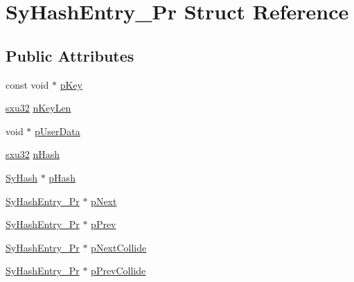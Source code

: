 \hypertarget{struct_sy_hash_entry___pr}{\section{Sy\-Hash\-Entry\-\_\-\-Pr Struct Reference}
\label{da/dbc/struct_sy_hash_entry___pr}
}
\subsection*{Public Attributes}
\begin{DoxyCompactItemize}
\item 
const void $\ast$ \hyperlink{struct_sy_hash_entry___pr_aa4c8c98ec7150fd90b413f0f9cc2d600}{p\-Key}
\item 
\hyperlink{unqlite_8c_abc5a8a3f345c200c98c485551f49666e}{sxu32} \hyperlink{struct_sy_hash_entry___pr_af6819beb48a1f81de55c46437c393efc}{n\-Key\-Len}
\item 
void $\ast$ \hyperlink{struct_sy_hash_entry___pr_aa64d3bb9514290195374bb7b609a4ca5}{p\-User\-Data}
\item 
\hyperlink{unqlite_8c_abc5a8a3f345c200c98c485551f49666e}{sxu32} \hyperlink{struct_sy_hash_entry___pr_ad03680a11812d7decfbb4ef5fe7654ec}{n\-Hash}
\item 
\hyperlink{struct_sy_hash}{Sy\-Hash} $\ast$ \hyperlink{struct_sy_hash_entry___pr_a8a5c25665356d85d7b6cd988bd8332bc}{p\-Hash}
\item 
\hyperlink{struct_sy_hash_entry___pr}{Sy\-Hash\-Entry\-\_\-\-Pr} $\ast$ \hyperlink{struct_sy_hash_entry___pr_acc053b28c9ecd62e2c21b138f3b5a26f}{p\-Next}
\item 
\hyperlink{struct_sy_hash_entry___pr}{Sy\-Hash\-Entry\-\_\-\-Pr} $\ast$ \hyperlink{struct_sy_hash_entry___pr_a7423a9ca375d103784c71caf7a1cf1f3}{p\-Prev}
\item 
\hyperlink{struct_sy_hash_entry___pr}{Sy\-Hash\-Entry\-\_\-\-Pr} $\ast$ \hyperlink{struct_sy_hash_entry___pr_afb47688543dd56806878c25f1d5d8763}{p\-Next\-Collide}
\item 
\hyperlink{struct_sy_hash_entry___pr}{Sy\-Hash\-Entry\-\_\-\-Pr} $\ast$ \hyperlink{struct_sy_hash_entry___pr_aa099b84a7316d5322967d041dcebcce7}{p\-Prev\-Collide}
\end{DoxyCompactItemize}


